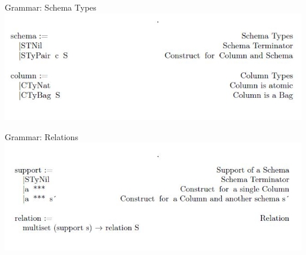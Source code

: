 \begin{frame}{Grammar: Schema Types}
\centering
%
%
\includegraphics[scale=0.6]{Images/Grammar/Schema.JPG}
\end{frame}


\begin{frame}{Grammar: Relations}
\centering
\includegraphics[scale=0.6]{Images/Grammar/Relation.JPG}
\end{frame}

